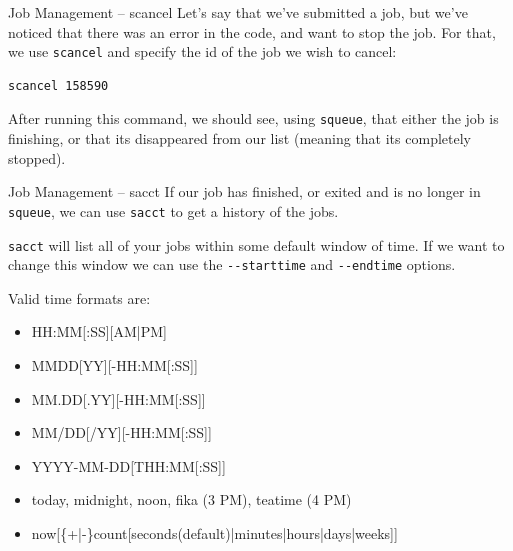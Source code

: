 \documentclass[10pt]{beamer}
\begin{document}
\begin{frame}[label={sec:orgcfde496},fragile]{Job Management -- scancel}
 Let's say that we've submitted a job, but we've noticed that there was an error
in the code, and want to stop the job. For that, we use \texttt{scancel} and specify the
id of the job we wish to cancel:

\begin{verbatim}
scancel 158590
\end{verbatim}

After running this command, we should see, using \texttt{squeue}, that either the job is
finishing, or that its disappeared from our list (meaning that its completely
stopped).
\end{frame}

\begin{frame}[label={sec:orgac93aee},fragile]{Job Management -- sacct}
 If our job has finished, or exited and is no longer in \texttt{squeue}, we can use \texttt{sacct}
to get a history of the jobs.

\texttt{sacct} will list all of your jobs within some default window of time. If we want
to change this window we can use the \texttt{-{}-starttime} and \texttt{-{}-endtime} options.

Valid time formats are:
\begin{itemize}
\item HH:MM[:SS][AM|PM]
\item MMDD[YY][-HH:MM[:SS]]
\item MM.DD[.YY][-HH:MM[:SS]]
\item MM/DD[/YY][-HH:MM[:SS]]
\item YYYY-MM-DD[THH:MM[:SS]]
\item today, midnight, noon, fika (3 PM), teatime (4 PM)
\item now[\{+|-\}count[seconds(default)|minutes|hours|days|weeks]]
\end{itemize}
\end{frame}
\end{document}
